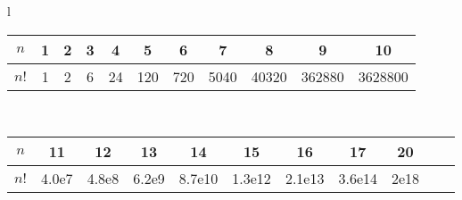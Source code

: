 \begin{center}
\begin{tabular}{l}
\begin{tabular}{c|c@{\ }c@{\ }c@{\ }c@{\ }c@{\ }c@{\ }c@{\ }c@{\ }c@{\ }c}
$n$  & 1 & 2 & 3 & 4  & 5   & 6   & 7    & 8     & 9      & 10\\
\hline
$n!$ & 1 & 2 & 6 & 24 & 120 & 720 & 5040 & 40320 & 362880 & 3628800\\
\end{tabular}\\
\begin{tabular}{c|c@{\ }c@{\ }c@{\ }c@{\ }c@{\ }c@{\ }c@{\ }c@{\ }c@{\ }c}
    $n$  & 11    & 12    & 13    & 14     & 15     & 16     & 17 & 20\\
\hline
    $n!$ & 4.0e7 & 4.8e8 & 6.2e9 & 8.7e10 & 1.3e12 & 2.1e13 & 3.6e14 & 2e18\\
\end{tabular}
\end{tabular}
\end{center}
